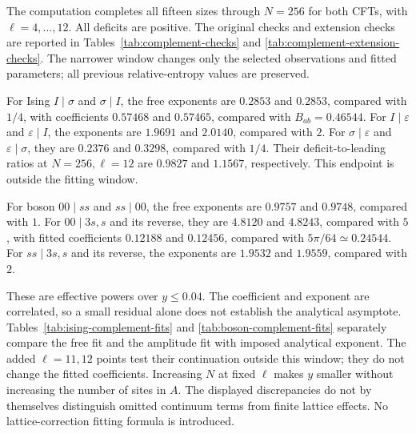 The computation completes all fifteen sizes through $N=256$ for both
CFTs, with $\ell=4,\ldots,12$. All deficits are positive. The original
checks and extension checks are reported in Tables~\ref{tab:complement-checks}
and \ref{tab:complement-extension-checks}. The narrower window changes
only the selected observations and fitted parameters; all previous
relative-entropy values are preserved.

For Ising $I\mid\sigma$ and $\sigma\mid I$, the free exponents are
$0.2853$ and $0.2853$,
compared with $1/4$, with coefficients
$0.57468$ and $0.57465$,
compared with $B_{ab}=0.46544$.
For $I\mid\varepsilon$ and $\varepsilon\mid I$, the exponents are
$1.9691$ and $2.0140$,
compared with $2$. For $\sigma\mid\varepsilon$ and $\varepsilon\mid\sigma$,
they are $0.2376$ and
$0.3298$, compared with $1/4$.
Their deficit-to-leading ratios at $N=256,\ell=12$ are
$0.9827$ and
$1.1567$, respectively.
This endpoint is outside the fitting window.

For boson $00\mid ss$ and $ss\mid00$, the free exponents are
$0.9757$ and $0.9748$,
compared with $1$. For $00\mid3s,s$ and its reverse, they are
$4.8120$ and $4.8243$,
compared with $5$, with fitted coefficients
$0.12188$ and $0.12456$,
compared with $5\pi/64\simeq0.24544$.
For $ss\mid3s,s$ and its reverse, the exponents are
$1.9532$ and $1.9559$,
compared with $2$.

These are effective powers over $y\leq0.04$. The coefficient and
exponent are correlated, so a small residual alone does not establish
the analytical asymptote. Tables~\ref{tab:ising-complement-fits} and
\ref{tab:boson-complement-fits} separately compare the free fit and the
amplitude fit with imposed analytical exponent. The added $\ell=11,12$
points test their continuation outside this window; they do not change
the fitted coefficients. Increasing $N$ at fixed $\ell$ makes $y$ smaller
without increasing the number of sites in $A$. The displayed discrepancies
do not by themselves distinguish omitted continuum terms from finite
lattice effects. No lattice-correction fitting formula is introduced.
